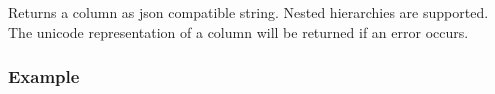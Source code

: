 \documentclass[a4paper,10pt, twoside,english]{sphinxmanual}
\begin{document}

\begin{fulllineitems}
\label{\detokenize{transformer/mapper:spooq2.transformer.mapper_custom_data_types._generate_select_expression_for_json_string}}
Returns a column as json compatible string.
Nested hierarchies are supported.
The unicode representation of a column will be returned if an error occurs.
\subsubsection*{Example}


\end{fulllineitems}
\end{document}
